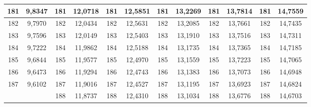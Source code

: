 \documentclass[a4paper,12pt]{article} %
\begin{document}
\begin{longtable}[c]{cccccccccc|c|c|}
	\multicolumn{1}{|c|}{181} & \multicolumn{1}{c|}{9,8347} & \multicolumn{1}{c|}{181} & \multicolumn{1}{c|}{12,0718} & \multicolumn{1}{c|}{181} & \multicolumn{1}{c|}{12,5851} & \multicolumn{1}{c|}{181} & \multicolumn{1}{c|}{13,2269} & \multicolumn{1}{c|}{181} & 13,7814 & 181 & 14,7559 \\ \hline
	\multicolumn{1}{|c|}{182} & \multicolumn{1}{c|}{9,7970} & \multicolumn{1}{c|}{182} & \multicolumn{1}{c|}{12,0434} & \multicolumn{1}{c|}{182} & \multicolumn{1}{c|}{12,5631} & \multicolumn{1}{c|}{182} & \multicolumn{1}{c|}{13,2085} & \multicolumn{1}{c|}{182} & 13,7661 & 182 & 14,7435 \\ \hline
	\multicolumn{1}{|c|}{183} & \multicolumn{1}{c|}{9,7596} & \multicolumn{1}{c|}{183} & \multicolumn{1}{c|}{12,0149} & \multicolumn{1}{c|}{183} & \multicolumn{1}{c|}{12,5403} & \multicolumn{1}{c|}{183} & \multicolumn{1}{c|}{13,1910} & \multicolumn{1}{c|}{183} & 13,7516 & 183 & 14,7311 \\ \hline
	\multicolumn{1}{|c|}{184} & \multicolumn{1}{c|}{9,7222} & \multicolumn{1}{c|}{184} & \multicolumn{1}{c|}{11,9862} & \multicolumn{1}{c|}{184} & \multicolumn{1}{c|}{12,5188} & \multicolumn{1}{c|}{184} & \multicolumn{1}{c|}{13,1735} & \multicolumn{1}{c|}{184} & 13,7365 & 184 & 14,7185 \\ \hline
	\multicolumn{1}{|c|}{185} & \multicolumn{1}{c|}{9,6844} & \multicolumn{1}{c|}{185} & \multicolumn{1}{c|}{11,9577} & \multicolumn{1}{c|}{185} & \multicolumn{1}{c|}{12,4970} & \multicolumn{1}{c|}{185} & \multicolumn{1}{c|}{13,1559} & \multicolumn{1}{c|}{185} & 13,7223 & 185 & 14,7065 \\ \hline
	\multicolumn{1}{|c|}{186} & \multicolumn{1}{c|}{9,6473} & \multicolumn{1}{c|}{186} & \multicolumn{1}{c|}{11,9294} & \multicolumn{1}{c|}{186} & \multicolumn{1}{c|}{12,4743} & \multicolumn{1}{c|}{186} & \multicolumn{1}{c|}{13,1383} & \multicolumn{1}{c|}{186} & 13,7073 & 186 & 14,6948 \\ \hline
	\multicolumn{1}{|c|}{187} & \multicolumn{1}{c|}{9,6102} & \multicolumn{1}{c|}{187} & \multicolumn{1}{c|}{11,9016} & \multicolumn{1}{c|}{187} & \multicolumn{1}{c|}{12,4527} & \multicolumn{1}{c|}{187} & \multicolumn{1}{c|}{13,1195} & \multicolumn{1}{c|}{187} & 13,6923 & 187 & 14,6824 \\ \hline
	& \multicolumn{1}{c|}{} & \multicolumn{1}{c|}{188} & \multicolumn{1}{c|}{11,8737} & \multicolumn{1}{c|}{188} & \multicolumn{1}{c|}{12,4310} & \multicolumn{1}{c|}{188} & \multicolumn{1}{c|}{13,1034} & \multicolumn{1}{c|}{188} & 13,6776 & 188 & 14,6703 \\ \cline{3-12} 

\end{longtable}
\end{document}
